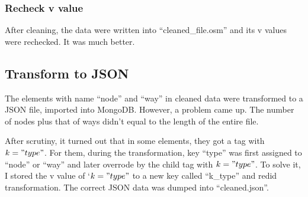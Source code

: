\documentclass[12pt]{article}
\begin{document}
\subsubsection{Recheck v value}
After cleaning, the data were written into ``cleaned\_file.osm'' and its v values were rechecked. It was much better.

\subsection{Transform to JSON}
The elements with name ``node'' and ``way'' in cleaned data were transformed to a JSON file, imported into MongoDB. However, a problem came up. The number of nodes plus that of ways didn't equal to the length of the entire file.

After scrutiny, it turned out that in some elements, they got a tag with $k="type"$. For them, during the transformation, key ``type'' was first assigned to ``node'' or ``way'' and later overrode by the child tag with $k="type"$. To solve it, I stored the v value of `$k="type"$ to a new key called ``k\_type'' and redid transformation. The correct JSON data was dumped into ``cleaned.json''.
\end{document}
